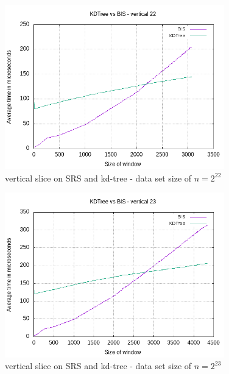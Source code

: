 \begin{figure}[h]
    \centering
    \includegraphics[width = 0.85\textwidth]{pictures/analysis/vert_22.png}
    \caption{vertical slice on SRS and kd-tree - data set size of $n=2^{22}$}\label{fig:vert_22}
\end{figure}

\begin{figure}[h]
    \centering
    \includegraphics[width = 0.85\textwidth]{pictures/analysis/vert_23.png}
    \caption{vertical slice on SRS and kd-tree - data set size of $n=2^{23}$}\label{fig:vert_23}
\end{figure}

\clearpage

